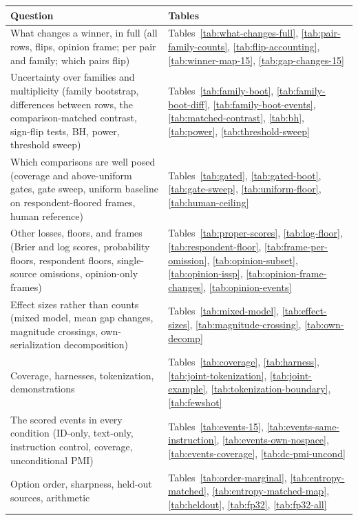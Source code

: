 \begin{table}[t]
\centering\scriptsize
\setlength{\tabcolsep}{4pt}
\begin{tabular}{@{}p{5.2cm}p{10.3cm}@{}}
\toprule
Question & Tables \\
\midrule
What changes a winner, in full (all rows, flips, opinion frame; per pair and family; which pairs flip) & Tables~\ref{tab:what-changes-full}, \ref{tab:pair-family-counts}, \ref{tab:flip-accounting}, \ref{tab:winner-map-15}, \ref{tab:gap-changes-15} \\
Uncertainty over families and multiplicity (family bootstrap, differences between rows, the comparison-matched contrast, sign-flip tests, BH, power, threshold sweep) & Tables~\ref{tab:family-boot}, \ref{tab:family-boot-diff}, \ref{tab:family-boot-events}, \ref{tab:matched-contrast}, \ref{tab:bh}, \ref{tab:power}, \ref{tab:threshold-sweep} \\
Which comparisons are well posed (coverage and above-uniform gates, gate sweep, uniform baseline on respondent-floored frames, human reference) & Tables~\ref{tab:gated}, \ref{tab:gated-boot}, \ref{tab:gate-sweep}, \ref{tab:uniform-floor}, \ref{tab:human-ceiling} \\
Other losses, floors, and frames (Brier and log scores, probability floors, respondent floors, single-source omissions, opinion-only frames) & Tables~\ref{tab:proper-scores}, \ref{tab:log-floor}, \ref{tab:respondent-floor}, \ref{tab:frame-per-omission}, \ref{tab:opinion-subset}, \ref{tab:opinion-issp}, \ref{tab:opinion-frame-changes}, \ref{tab:opinion-events} \\
Effect sizes rather than counts (mixed model, mean gap changes, magnitude crossings, own-serialization decomposition) & Tables~\ref{tab:mixed-model}, \ref{tab:effect-sizes}, \ref{tab:magnitude-crossing}, \ref{tab:own-decomp} \\
Coverage, harnesses, tokenization, demonstrations & Tables~\ref{tab:coverage}, \ref{tab:harness}, \ref{tab:joint-tokenization}, \ref{tab:joint-example}, \ref{tab:tokenization-boundary}, \ref{tab:fewshot} \\
The scored events in every condition (ID-only, text-only, instruction control, coverage, unconditional PMI) & Tables~\ref{tab:events-15}, \ref{tab:events-same-instruction}, \ref{tab:events-own-nospace}, \ref{tab:events-coverage}, \ref{tab:dc-pmi-uncond} \\
Option order, sharpness, held-out sources, arithmetic & Tables~\ref{tab:order-marginal}, \ref{tab:entropy-matched}, \ref{tab:entropy-matched-map}, \ref{tab:heldout}, \ref{tab:fp32}, \ref{tab:fp32-all} \\

\end{tabular}
\end{table}
